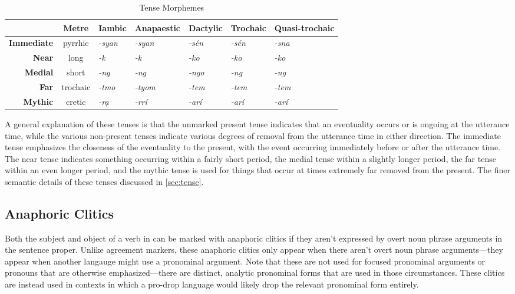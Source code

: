 \documentclass[a4paper,11pt,oneside,openany]{memoir}
\begin{document}
\begin{table}[h]
    \centering
    \begin{tabular}{@{}rclllll@{}}
        \toprule
        \textbf{} & \textbf{Metre} & \multicolumn{1}{c}{\textbf{Iambic}} & \multicolumn{1}{c}{\textbf{Anapaestic}} & \multicolumn{1}{c}{\textbf{Dactylic}} & \multicolumn{1}{c}{\textbf{Trochaic}} & \multicolumn{1}{c}{\textbf{Quasi-trochaic}} \\ \midrule
        \textbf{Immediate} & pyrrhic & \textit{-syan} & \textit{-syan} & \textit{-sén} & \textit{-sén} & \textit{-sna} \\
        \textbf{Near} & long & \textit{-k} & \textit{-k} & \textit{-ko} & \textit{-ko} & \textit{-ko} \\
        \textbf{Medial} & short & \textit{-ng} & \textit{-ng} & \textit{-ngo} & \textit{-ng} & \textit{-ng} \\
        \textbf{Far} & trochaic & \textit{-tmo} & \textit{-tyom} & \textit{-tem} & \textit{-tem} & \textit{-tem} \\
        \textbf{Mythic} & cretic & \textit{-\supglot{}rạ\suphi{}} & \textit{-\supglot{}rrí} & \textit{-\supglot{}arí} & \textit{-\supglot{}arí} & \textit{-\supglot{}arí} \\ \bottomrule
        \end{tabular}
    \caption{Tense Morphemes}
    \label{tab:tense-morph}
    \end{table}

A general explanation of these tenses is that the unmarked present tense indicates that an eventuality occurs or is ongoing at the utterance time, while the various non-present tenses indicate various degrees of removal from the utterance time in either direction. The immediate tense emphasizes the closeness of the eventuality to the present, with the event occurring immediately before or after the utterance time. The near tense indicates something occurring within a fairly short period, the medial tense within a slightly longer period, the far tense within an even longer period, and the mythic tense is used for things that occur at times extremely far removed from the present. The finer semantic details of these tenses discussed in \autoref{sec:tense}.

\subsection{Anaphoric Clitics}\label{subsec:morph_ana_clit}

Both the subject and object of a verb in \parentlang{} can be marked with anaphoric clitics if they aren't expressed by overt noun phrase arguments in the sentence proper. Unlike agreement markers, these anaphoric clitics only appear when there aren't overt noun phrase arguments---they appear when another langauge might use a pronominal argument. Note that these are not used for focused pronominal arguments or pronouns that are otherwise emphasized---there are distinct, analytic pronominal forms that are used in those circumstances. These clitics are instead used in contexts in which a pro-drop language would likely drop the relevant pronominal form entirely.
\end{document}
